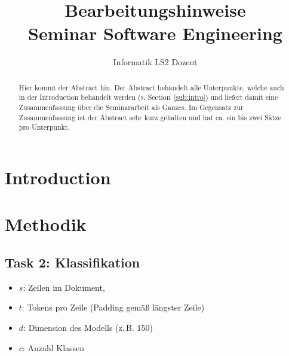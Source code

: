 \documentclass[runningheads,a4paper,12pt]{uwsese}
\begin{document}
\mainmatter 

\title{Bearbeitungshinweise\\ Seminar Software Engineering}



\author{Informatik LS2 Dozent}
%



\maketitle


\begin{abstract}
	Hier kommt der Abstract hin. Der Abstract behandelt alle Unterpunkte, welche auch in der Introduction behandelt werden (s. Section~\ref{sub:intro}) und liefert damit eine Zusammenfassung über die Seminararbeit als Ganzes. Im Gegensatz zur Zusammenfassung ist der Abstract sehr kurz gehalten und hat ca. ein bis zwei Sätze pro Unterpunkt.
\end{abstract}


\section{Introduction}

\section{Methodik}
\subsection{Task 2: Klassifikation}

\begin{itemize}
\item $s$: Zeilen im Dokument,
\item $t$: Tokens pro Zeile (Padding gemäß längster Zeile)
\item $d$: Dimension des Modells (z.\,B. 150)
\item $c$: Anzahl Klassen
\end{itemize}
\end{document}
